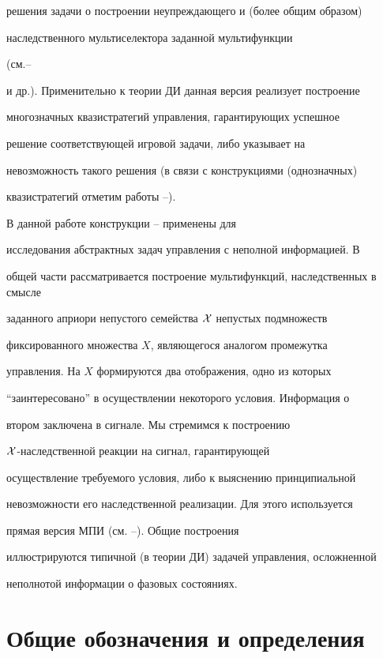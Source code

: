 решения задачи о построении неупреждающего и (более общим образом)


наследственного мультиселектора заданной мультифункции


(см.\cite{23}--\cite{26}


и др.). Применительно к теории ДИ данная версия реализует построение


многозначных квазистратегий управления, гарантирующих успешное


решение соответствующей игровой задачи, либо указывает на


невозможность такого решения (в связи с конструкциями (однозначных)


квазистратегий отметим работы \cite{27}--\cite{29}).





В данной работе конструкции \cite{23}--\cite{26} применены для


исследования абстрактных задач управления с неполной информацией. В


общей части рассматривается построение мультифункций, наследственных в смысле


заданного априори непустого семейства $\cal{X}$ непустых подмножеств


фиксированного множества $X$, являющегося аналогом промежутка


управления. На $X$ формируются два отображения, одно из которых


``заинтересовано'' в осуществлении некоторого условия. Информация о


втором заключена в сигнале. Мы стремимся к построению


$\cal{X}$-наследственной реакции на сигнал, гарантирующей


осуществление требуемого условия, либо к выяснению принципиальной


невозможности его наследственной реализации. Для этого используется


прямая версия МПИ (см. \cite{23}--\cite{26}). Общие построения


иллюстрируются типичной (в теории ДИ) задачей управления, осложненной


неполнотой информации о фазовых состояниях.








\section{Общие обозначения и определения}





